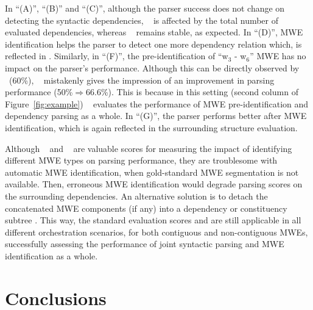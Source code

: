 \documentclass[output=paper]{LSP/langsci}
\begin{document}
In ``(A)'', ``(B)'' and ``(C)'', although the parser success does not change on detecting the syntactic dependencies, \asuo~ is affected by the total number of evaluated dependencies, whereas \asus~ remains stable, as expected.
In ``(D)'', MWE identification helps the parser to detect one more dependency relation which, is reflected in \asus{}.
Similarly, in ``(F)'', the pre-identification of  ``w$_3$ - w$_6$'' MWE has no impact on the parser's performance.
Although this can be directly observed by \asus~(60\%), \asuo~ mistakenly gives the impression of an improvement in parsing performance (50\%$\Rightarrow$66.6\%). This is because  in this setting (second column of Figure~\ref{fig:example})
\asuo~ evaluates the performance of MWE pre-identification and dependency parsing as a whole.
In ``(G)'', the parser performs better after MWE identification, which is again reflected in the surrounding structure evaluation.

Although \asus~ and \asls~ are valuable scores for measuring the impact of identifying different MWE types on parsing performance, they are troublesome with automatic MWE identification, when gold-standard MWE segmentation is not available. Then, erroneous MWE identification would degrade parsing scores on the surrounding dependencies.
An alternative solution is to detach the concatenated MWE components (if any) into a dependency or constituency subtree \citep{candito2014strategies,eryigit:2011:mes:2206359.2206365}. This way, the standard evaluation scores \asu{} and \asl{} are still applicable in all different orchestration scenarios, for both contiguous and non-contiguous MWEs, successfully assessing the performance of joint syntactic parsing and MWE identification as a whole.

%
\section{Conclusions}
\label{sec:conclusions}
\end{document}
